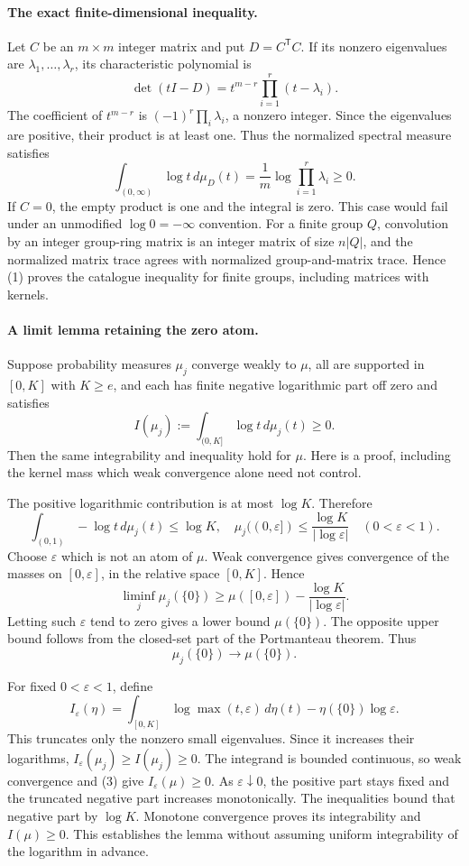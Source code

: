 \documentclass[11pt]{article}
\begin{document}
\paragraph{The exact finite-dimensional inequality.}
Let $C$ be an $m\times m$ integer matrix and put $D=C^{\mathsf T}C$.
If its nonzero eigenvalues are $\lambda_1,\ldots,\lambda_r$, its
characteristic polynomial is
\[
 \det(tI-D)=t^{m-r}\prod_{i=1}^r(t-\lambda_i).
\]
The coefficient of $t^{m-r}$ is
$(-1)^r\prod_i\lambda_i$, a nonzero integer. Since the eigenvalues
are positive, their product is at least one. Thus the normalized
spectral measure satisfies
\[
 \int_{(0,\infty)}\log t\,d\mu_D(t)
 =\frac1m\log\prod_{i=1}^r\lambda_i\ge0.             \tag{1}
\]
If $C=0$, the empty product is one and the integral is zero. This
case would fail under an unmodified $\log0=-\infty$ convention.
For a finite group $Q$, convolution by an integer group-ring matrix
is an integer matrix of size $n|Q|$, and the normalized matrix trace
agrees with normalized group-and-matrix trace. Hence (1) proves the
catalogue inequality for finite groups, including matrices with kernels.

\paragraph{A limit lemma retaining the zero atom.}
Suppose probability measures $\mu_j$ converge weakly to $\mu$, all
are supported in $[0,K]$ with $K\ge e$, and each has finite negative
logarithmic part off zero and satisfies
\[
 I(\mu_j):=\int_{(0,K]}\log t\,d\mu_j(t)\ge0.
\]
Then the same integrability and inequality hold for $\mu$. Here is
a proof, including the kernel mass which weak convergence alone need
not control.

The positive logarithmic contribution is at most $\log K$. Therefore
\[
 \int_{(0,1)}-\log t\,d\mu_j(t)\le\log K,
 \quad
 \mu_j((0,\varepsilon])\le
 \frac{\log K}{|\log\varepsilon|}\quad(0<\varepsilon<1).
                                                        \tag{2}
\]
Choose $\varepsilon$ which is not an atom of $\mu$. Weak convergence
gives convergence of the masses on $[0,\varepsilon]$, in the relative
space $[0,K]$. Hence
\[
 \liminf_j\mu_j(\{0\})\ge
 \mu([0,\varepsilon])-\frac{\log K}{|\log\varepsilon|}.
\]
Letting such $\varepsilon$ tend to zero gives a lower bound
$\mu(\{0\})$. The opposite upper bound follows from the closed-set
part of the Portmanteau theorem. Thus
\[
 \mu_j(\{0\})\longrightarrow\mu(\{0\}).              \tag{3}
\]

For fixed $0<\varepsilon<1$, define
\[
 I_\varepsilon(\eta)=
 \int_{[0,K]}\log\max(t,\varepsilon)\,d\eta(t)
 -\eta(\{0\})\log\varepsilon.
\]
This truncates only the nonzero small eigenvalues. Since it increases
their logarithms, $I_\varepsilon(\mu_j)\ge I(\mu_j)\ge0$.
The integrand is bounded continuous, so weak convergence and (3)
give $I_\varepsilon(\mu)\ge0$. As $\varepsilon\downarrow0$, the
positive part stays fixed and the truncated negative part increases
monotonically. The inequalities bound that negative part by $\log K$.
Monotone convergence proves its integrability and $I(\mu)\ge0$.
This establishes the lemma without assuming uniform integrability of
the logarithm in advance.
\end{document}
